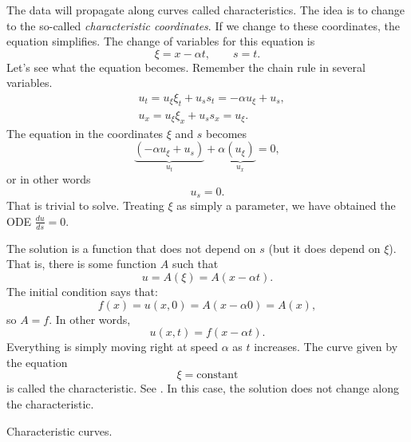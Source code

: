 \documentclass{ximera}
\begin{document}
\begin{exampleSol}
    The data will propagate along curves called characteristics.  The idea is to change to the so-called \emph{characteristic coordinates}.  If we change to these coordinates, the equation simplifies.  The change of variables for this equation is
    \begin{equation*}
        \xi = x - \alpha t ,  \qquad s = t .
    \end{equation*}
    Let's see what the equation becomes. Remember the chain rule in several variables.
    \begin{align*}
        & u_t = u_\xi \xi_t + u_s s_t = - \alpha u_\xi + u_s , \\
        & u_x = u_\xi \xi_x + u_s s_x = u_\xi .
    \end{align*}
    The equation in the coordinates $\xi$ and $s$ becomes
    \begin{equation*}
        \underbrace{(- \alpha u_\xi + u_s)}_{u_t} + \alpha \underbrace{(u_\xi)}_{u_x} = 0 ,
    \end{equation*}
    or in other words
    \begin{equation*}
        u_s = 0 .
    \end{equation*}
    That is trivial to solve.  Treating $\xi$ as simply a parameter, we have obtained the ODE $\frac{d u}{d s} = 0$.
    
    The solution is a function that does not depend on $s$ (but it does depend on $\xi$). That is, there is some function $A$ such that
    \begin{equation*}
        u = A(\xi) = A(x - \alpha t) .
    \end{equation*}
    The initial condition says that:
    \begin{equation*}
        f(x) = u(x,0) = A(x - \alpha 0) = A(x) ,
    \end{equation*}
    so $A=f$.  In other words,
    \begin{equation*}
        u(x,t) = f(x-\alpha t) .
    \end{equation*}
    Everything is simply moving right at speed $\alpha$ as $t$ increases. The curve given by the equation
    \begin{equation*}
        \xi = \text{constant}
    \end{equation*}
    is called the characteristic. See . In this case, the solution does not change along the characteristic.
    
    \begin{mywrapfig}{2.8in}
        \capstart
        
        \caption{Characteristic curves.\label{fopde:charcurves}}
    \end{mywrapfig}
    

\end{exampleSol}
\end{document}
